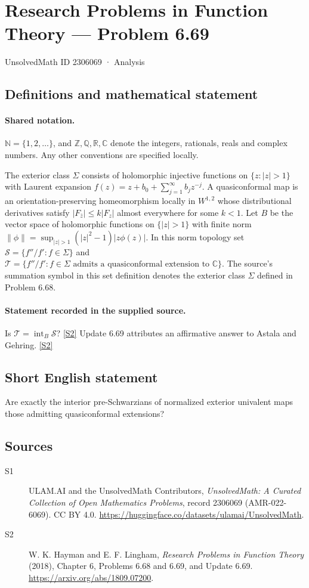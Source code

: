 \documentclass[11pt]{article}
\newcommand{\sref}[2]{\hyperlink{source:#1:#2}{[S#2]}}
\begin{document}
\setcounter{section}{2306068}
\section{Research Problems in Function Theory — Problem 6.69}\label{2306069}
{\small\sffamily UnsolvedMath ID 2306069 · Analysis}
\subsection{Definitions and mathematical statement}

\paragraph{Shared notation.}$\mathbb N=\{1,2,\ldots\}$, and $\mathbb Z,\mathbb Q,\mathbb R,\mathbb C$ denote the integers, rationals, reals and complex numbers. Any other conventions are specified locally.


The exterior class $\Sigma$ consists of holomorphic injective functions on $\{z:|z|>1\}$ with Laurent expansion $f(z)=z+b_0+\sum_{j=1}^{\infty}b_jz^{-j}$. A quasiconformal map is an orientation-preserving homeomorphism locally in $W^{1,2}$ whose distributional derivatives satisfy $|F_{\bar z}|\le k|F_z|$ almost everywhere for some $k<1$. Let $B$ be the vector space of holomorphic functions on $\{|z|>1\}$ with finite norm $\|\phi\|=\sup_{|z|>1}(|z|^2-1)|z\phi(z)|$. In this norm topology set $\mathcal S=\{f''/f':f\in\Sigma\}$ and $\mathcal T=\{f''/f':f\in\Sigma\text{ admits a quasiconformal extension to }\mathbb C\}$. The source's summation symbol in this set definition denotes the exterior class $\Sigma$ defined in Problem 6.68.
\paragraph{Statement recorded in the supplied source.}
Is $\mathcal T=\operatorname{int}_B\mathcal S$? \sref{2306069}{2}
Update 6.69 attributes an affirmative answer to Astala and Gehring. \sref{2306069}{2}
\subsection{Short English statement}
Are exactly the interior pre-Schwarzians of normalized exterior univalent maps those admitting quasiconformal extensions?
\subsection{Sources}
\begin{description}
\item[\hypertarget{source:2306069:1}{S1}] ULAM.AI and the UnsolvedMath Contributors, \emph{UnsolvedMath: A Curated Collection of Open Mathematics Problems}, record 2306069 (AMR-022-6069). CC BY 4.0. \url{https://huggingface.co/datasets/ulamai/UnsolvedMath}.
\item[\hypertarget{source:2306069:2}{S2}] W. K. Hayman and E. F. Lingham, \emph{Research Problems in Function Theory} (2018), Chapter 6, Problems 6.68 and 6.69, and Update 6.69. \url{https://arxiv.org/abs/1809.07200}.
\end{description}
\label{end:2306069}
\end{document}
